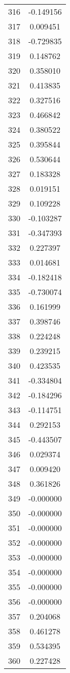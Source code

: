 \documentclass[12pt]{article}
\begin{document}
\begin{longtable}{@{}cc@{}}
316 & -0.149156 \\
317 & 0.009451 \\
318 & -0.729835 \\
319 & 0.148762 \\
320 & 0.358010 \\
321 & 0.413835 \\
322 & 0.327516 \\
323 & 0.466842 \\
324 & 0.380522 \\
325 & 0.395844 \\
326 & 0.530644 \\
327 & 0.183328 \\
328 & 0.019151 \\
329 & 0.109228 \\
330 & -0.103287 \\
331 & -0.347393 \\
332 & 0.227397 \\
333 & 0.014681 \\
334 & -0.182418 \\
335 & -0.730074 \\
336 & 0.161999 \\
337 & 0.398746 \\
338 & 0.224248 \\
339 & 0.239215 \\
340 & 0.423535 \\
341 & -0.334804 \\
342 & -0.184296 \\
343 & -0.114751 \\
344 & 0.292153 \\
345 & -0.443507 \\
346 & 0.029374 \\
347 & 0.009420 \\
348 & 0.361826 \\
349 & -0.000000 \\
350 & -0.000000 \\
351 & -0.000000 \\
352 & -0.000000 \\
353 & -0.000000 \\
354 & -0.000000 \\
355 & -0.000000 \\
356 & -0.000000 \\
357 & 0.204068 \\
358 & 0.461278 \\
359 & 0.534395 \\
360 & 0.227428 \\

\end{longtable}
\end{document}
